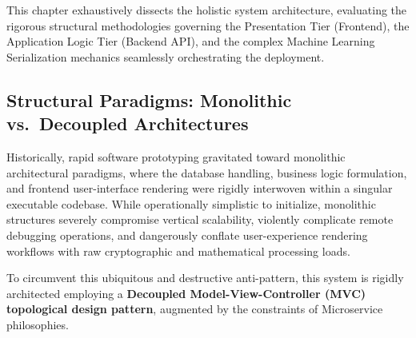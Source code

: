 This chapter exhaustively dissects the holistic system architecture,
evaluating the rigorous structural methodologies governing the
Presentation Tier (Frontend), the Application Logic Tier (Backend API),
and the complex Machine Learning Serialization mechanics seamlessly
orchestrating the deployment.

\hypertarget{structural-paradigms-monolithic-vs.-decoupled-architectures}{%
\subsection{Structural Paradigms: Monolithic vs.~Decoupled
Architectures}\label{structural-paradigms-monolithic-vs.-decoupled-architectures}}

Historically, rapid software prototyping gravitated toward monolithic
architectural paradigms, where the database handling, business logic
formulation, and frontend user-interface rendering were rigidly
interwoven within a singular executable codebase. While operationally
simplistic to initialize, monolithic structures severely compromise
vertical scalability, violently complicate remote debugging operations,
and dangerously conflate user-experience rendering workflows with raw
cryptographic and mathematical processing loads.

To circumvent this ubiquitous and destructive anti-pattern, this system
is rigidly architected employing a \textbf{Decoupled
Model-View-Controller (MVC) topological design pattern}, augmented by
the constraints of Microservice philosophies.

